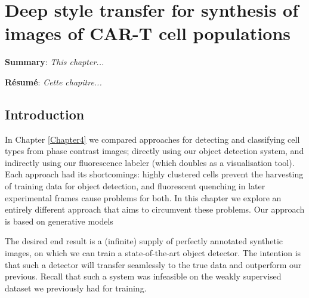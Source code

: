 
\chapter{Deep style transfer for synthesis of images of CAR-T cell populations} %

\label{Chapter5} %

\textbf{Summary}: \emph{This chapter...}

\textbf{R\'esum\'e}: \emph{Cette chapitre...}

\section{Introduction}

In Chapter \ref{Chapter4} we compared approaches for detecting and classifying cell types from phase contrast images; directly using our object detection system, and indirectly using our fluorescence labeler (which doubles as a visualisation tool). Each approach had its shortcomings: highly clustered cells prevent the harvesting of training data for object detection, and fluorescent quenching in later experimental frames cause problems for both. In this chapter we explore an entirely different approach that aims to circumvent these problems. Our approach is based on generative models

The desired end result is a (infinite) supply of perfectly annotated synthetic images, on which we can train a state-of-the-art object detector. The intention is that such a detector will transfer seamlessly to the true data and outperform our previous. Recall that such a system was infeasible on the weakly supervised dataset we previously had for training.

